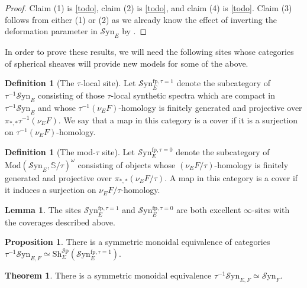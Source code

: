 \documentclass[10pt]{amsart}
\theoremstyle{definition}
\numberwithin{figure}{section}
\numberwithin{equation}{section}
\newtheorem{theorem}[figure]{Theorem}
\newtheorem{lemma}[figure]{Lemma}
\newtheorem{proposition}[figure]{Proposition}
\newtheorem{definition}[figure]{Definition}
\theoremstyle{cited}
\newcommand{\bS}{\mathbb{S}}
\newcommand{\Sp}{{\mathcal{S}\mathrm{p}}}
\newcommand{\Mod}{\mathrm{Mod}}
\newcommand{\Sh}{\mathrm{Sh}}
\newcommand{\fp}{\mathrm{fp}}
\newcommand{\Syn}{\mathcal{S}\mathrm{yn}}
\begin{document}
\begin{proof}
  Claim (1) is \ref{todo}, claim (2) is \ref{todo}, and claim (4) is \ref{todo}. Claim (3) follows from either (1) or (2) as we already know the effect of inverting the deformation parameter in $\Syn_E$ by \cite{todo}.
\end{proof}

In order to prove these results, we will need the following sites whose categories of spherical sheaves will provide new models for some of the above.

\begin{definition}[The $\tau$-local site]
  Let $\Syn_E^{\fp, \tau=1}$ denote the subcategory of $\tau^{-1}\Syn_E$ consisting of those $\tau$-local synthetic spectra which are compact in $\tau^{-1}\Syn_E$ and whose $\tau^{-1}(\nu_E F)$-homology is finitely generated and projective over $\pi_{*,*}\tau^{-1}(\nu_E F)$. We say that a map in this category is a cover if it is a surjection on $\tau^{-1}(\nu_E F)$-homology.
\end{definition}

\begin{definition}[The mod-$\tau$ site]
  Let $\Syn_E^{\fp, \tau=0}$ denote the subcategory of $\Mod(\Syn_E, \bS/\tau)^\omega$ consisting of objects whose $(\nu_E F/\tau)$-homology is finitely generated and projective over $\pi_{*,*}(\nu_E F/ \tau)$. A map in this category is a cover if it induces a surjection on $\nu_E F/ \tau$-homology.
\end{definition}

\begin{lemma}
  The sites $\Syn_E^{\fp, \tau=1}$ and $\Syn_E^{\fp, \tau=0}$ are both excellent $\infty$-sites with the coverages described above.
\end{lemma}

\begin{proposition}
  There is a symmetric monoidal equivalence  of categories $\tau^{-1}\Syn_{E,F}\simeq \Sh_{\Sigma}^\Sp(\Syn_E^{\fp, \tau=1})$.
\end{proposition}

\begin{theorem}
  There is a symmetric monoidal equivalence $\tau^{-1}\Syn_{E,F}\simeq \Syn_F$.
\end{theorem}
\end{document}
